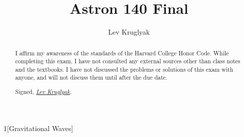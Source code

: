 \documentclass{../../templates/lkx_pset}
\title{Astron 140 Final}
\author{Lev Kruglyak}
\begin{document}
\maketitle

\vfill
\begin{abstract}
I affirm my awareness of the standards of the Harvard College Honor Code. While completing this exam, I have not consulted any external sources other than class notes and the textbooks. I have not discussed the problems or solutions of this exam with anyone, and will not discuss them until after the due date.

\medskip
Signed, \underline{\textit{Lev Kruglyak}}.
\end{abstract}
\vfill

\pagebreak
\begin{problem}{1}[Gravitational Waves]
\end{problem}
\end{document}
